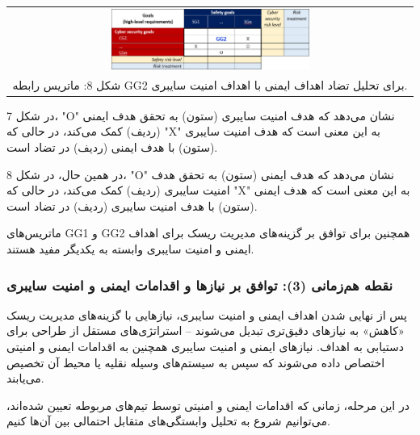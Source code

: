 \documentclass[a4paper,10pt]{article}
\begin{document}
                \begin{table}
            
                    \centering
                    \begin{tabular}{ c }
                        
                        \includegraphics[width=0.5\textwidth]{Image/fig8.jpg} \\
        
                        شکل 8: ماتریس رابطه GG2 برای تحلیل تضاد اهداف ایمنی با اهداف امنیت سایبری.
        
                    \end{tabular}
        
                \end{table}

                در شکل 7، "O" نشان می‌دهد که هدف امنیت سایبری (ستون) به تحقق هدف ایمنی (ردیف) کمک می‌کند، در حالی که "X" به این معنی است که هدف امنیت سایبری (ستون) با هدف ایمنی (ردیف) در تضاد است.

                در همین حال، در شکل 8، "O" نشان می‌دهد که هدف ایمنی (ستون) به تحقق هدف امنیت سایبری (ردیف) کمک می‌کند، در حالی که "X" به این معنی است که هدف ایمنی (ستون) با هدف امنیت سایبری (ردیف) در تضاد است.

                ماتریس‌های GG1 و GG2 همچنین برای توافق بر گزینه‌های مدیریت ریسک برای اهداف ایمنی و امنیت سایبری وابسته به یکدیگر مفید هستند.

            \subsubsection{نقطه هم‌زمانی (3): توافق بر نیازها و اقدامات ایمنی و امنیت سایبری}

                پس از نهایی شدن اهداف ایمنی و امنیت سایبری، نیازهایی با گزینه‌های مدیریت ریسک «کاهش» به نیازهای دقیق‌تری تبدیل می‌شوند – استراتژی‌های مستقل از طراحی برای دستیابی به اهداف. نیازهای ایمنی و امنیت سایبری همچنین به اقدامات ایمنی و امنیتی اختصاص داده می‌شوند که سپس به سیستم‌های وسیله نقلیه یا محیط آن تخصیص می‌یابند.

                در این مرحله، زمانی که اقدامات ایمنی و امنیتی توسط تیم‌های مربوطه تعیین شده‌اند، می‌توانیم شروع به تحلیل وابستگی‌های متقابل احتمالی بین آن‌ها کنیم.
\end{document}
